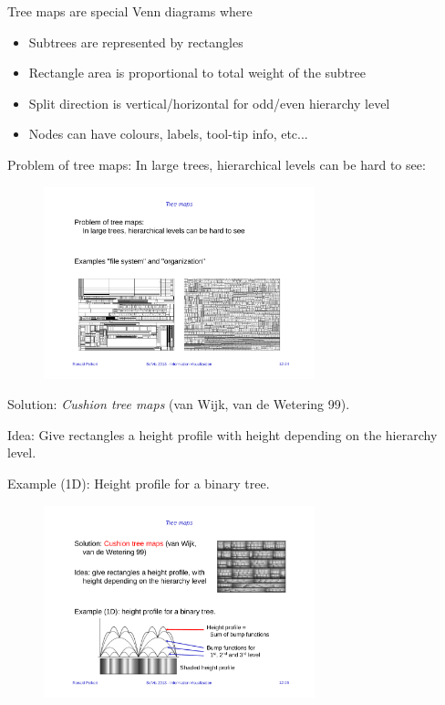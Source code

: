 Tree maps are special Venn diagrams where
\begin{itemize}
\item Subtrees are represented by rectangles
\item Rectangle area is proportional to total weight of the subtree
\item Split direction is vertical/horizontal for odd/even hierarchy level
\item Nodes can have colours, labels, tool-tip info, etc...
\end{itemize}

Problem of tree maps:
 In large trees, hierarchical levels can be hard to see:
\begin{figure}[H]
\centering
\includegraphics[width=0.7\textwidth]{img/12_tree_map_fs}
\end{figure}

Solution: \emph{Cushion tree maps} (van Wijk, van de Wetering 99).

Idea: Give rectangles a height profile with height depending on the hierarchy level.

Example (1D): Height profile for a binary tree.
\begin{figure}[H]
\centering
\includegraphics[width=0.7\textwidth]{img/12_cushion_tree_maps}
\end{figure}

